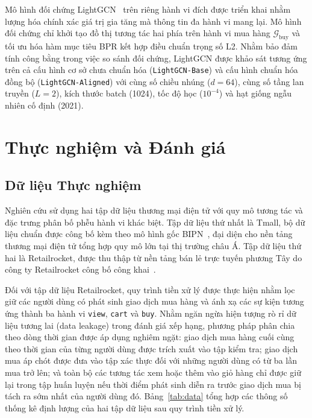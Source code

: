 \documentclass{llncs}
\begin{document}
Mô hình đối chứng LightGCN~\cite{he2020lightgcn} trên riêng hành vi đích được triển khai nhằm lượng hóa chính xác giá trị gia tăng mà thông tin đa hành vi mang lại. Mô hình đối chứng chỉ khởi tạo đồ thị tương tác hai phía trên hành vi mua hàng $\mathcal{G}_{\mathrm{buy}}$ và tối ưu hóa hàm mục tiêu BPR kết hợp điều chuẩn trọng số L2. Nhằm bảo đảm tính công bằng trong việc so sánh đối chứng, LightGCN được khảo sát tương ứng trên cả cấu hình cơ sở chưa chuẩn hóa (\texttt{LightGCN-Base}) và cấu hình chuẩn hóa đồng bộ (\texttt{LightGCN-Aligned}) với cùng số chiều nhúng ($d=64$), cùng số tầng lan truyền ($L=2$), kích thước batch (1024), tốc độ học ($10^{-4}$) và hạt giống ngẫu nhiên cố định (2021).

\section{Thực nghiệm và Đánh giá}
\label{sec:exp}

\subsection{Dữ liệu Thực nghiệm}
\label{sec:datasets}

Nghiên cứu sử dụng hai tập dữ liệu thương mại điện tử với quy mô tương tác và đặc trưng phân bố phễu hành vi khác biệt. Tập dữ liệu thứ nhất là Tmall, bộ dữ liệu chuẩn được công bố kèm theo mô hình gốc BIPN~\cite{yan2024bipn}, đại diện cho nền tảng thương mại điện tử tổng hợp quy mô lớn tại thị trường châu Á. Tập dữ liệu thứ hai là Retailrocket, được thu thập từ nền tảng bán lẻ trực tuyến phương Tây do công ty Retailrocket công bố công khai~\cite{retailrocket2016}.

Đối với tập dữ liệu Retailrocket, quy trình tiền xử lý được thực hiện nhằm lọc giữ các người dùng có phát sinh giao dịch mua hàng và ánh xạ các sự kiện tương ứng thành ba hành vi \texttt{view}, \texttt{cart} và \texttt{buy}. Nhằm ngăn ngừa hiện tượng rò rỉ dữ liệu tương lai (data leakage) trong đánh giá xếp hạng, phương pháp phân chia theo dòng thời gian được áp dụng nghiêm ngặt: giao dịch mua hàng cuối cùng theo thời gian của từng người dùng được trích xuất vào tập kiểm tra; giao dịch mua áp chót được đưa vào tập xác thực đối với những người dùng có từ ba lần mua trở lên; và toàn bộ các tương tác xem hoặc thêm vào giỏ hàng chỉ được giữ lại trong tập huấn luyện nếu thời điểm phát sinh diễn ra trước giao dịch mua bị tách ra sớm nhất của người dùng đó. Bảng~\ref{tab:data} tổng hợp các thông số thống kê định lượng của hai tập dữ liệu sau quy trình tiền xử lý.
\end{document}
